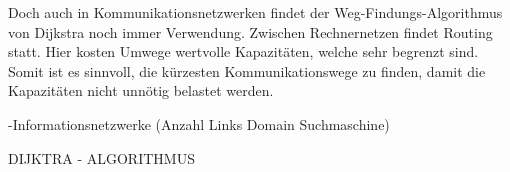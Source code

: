 Doch auch in Kommunikationsnetzwerken findet der Weg-Findungs-Algorithmus von Dijkstra noch immer Verwendung.
Zwischen Rechnernetzen findet Routing statt. Hier kosten Umwege wertvolle Kapazitäten, welche sehr begrenzt sind. Somit ist es sinnvoll, die kürzesten Kommunikationswege zu finden, damit die Kapazitäten nicht unnötig belastet werden.


-Informationsnetzwerke (Anzahl Links Domain Suchmaschine)

DIJKTRA - ALGORITHMUS